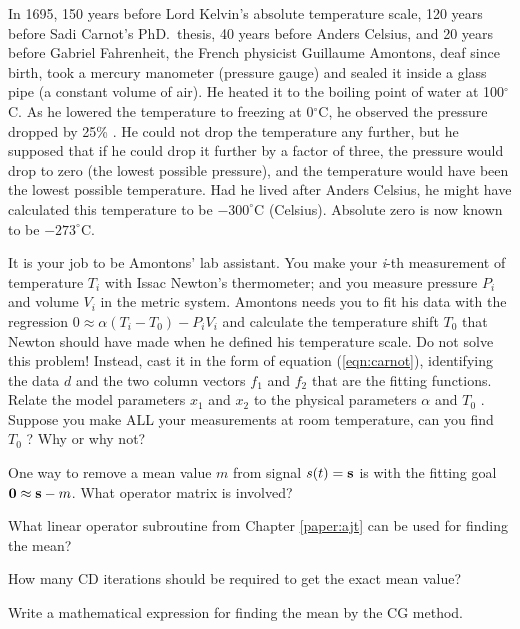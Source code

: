 \begin{exer}
\item In 1695,
150 years before Lord Kelvin's absolute temperature scale,
120 years before Sadi Carnot's PhD.~thesis,
40 years before Anders Celsius,
and 20 years before Gabriel Fahrenheit,
the French physicist Guillaume Amontons,
deaf  since birth,
took a mercury manometer (pressure gauge) and sealed it inside a glass pipe (a constant volume of air).
He heated it to the boiling point of water at 100$^\circ$C.
As he lowered the temperature to freezing at 0$^\circ$C,
he observed the pressure dropped by {25\%} .
He could not drop the temperature any further, but he supposed that if he could drop it further by a factor of three,
the pressure would drop to zero (the lowest possible pressure), and the temperature would have been the lowest possible temperature.
Had he lived after Anders Celsius, he might have calculated this temperature to be $-300^\circ$C (Celsius).
Absolute  zero is now known to be $-273^\circ$C.
\par
It is your job to be Amontons' lab assistant.
You make your {\it i}-th measurement of temperature $T_i$ with Issac
Newton's thermometer; 
and you measure pressure $P_i$ and volume $V_i$ in the metric system.
Amontons needs you to fit his data with the regression $0 \approx \alpha (T_i - T_0 ) - P_i V_i$ and calculate the temperature shift $T_0$ that Newton should have made when he defined his temperature scale.
Do not solve this problem!
Instead,
cast it in the form of equation (\ref{eqn:carnot}),
identifying the data $d$ and the two column vectors $f_1$ and $f_2$ that are the fitting functions.
Relate the model parameters $x_1$ and $x_2$ to the physical parameters $\alpha$ and $T_0$ .
Suppose you make ALL your measurements at room temperature,
can you find $T_0$ ?
Why or why not? 

\item
One way to remove a mean value $m$ from signal $s(t)= \bold s$
is with the fitting goal $\bold 0 \approx \bold s - m$.
What operator matrix is involved?

\item
What linear operator subroutine from Chapter \ref{paper:ajt}
can be used for finding the mean?

\item
How many CD iterations should be required to get the exact mean value?

\item
Write a mathematical expression for finding the mean by the CG method.

\end{exer}


\clearpage

